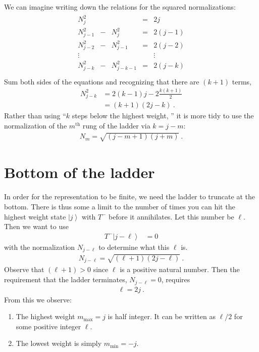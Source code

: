 \documentclass[12pt]{article}
\numberwithin{equation}{section}
\newcommand{\ket}[1]{\left|#1\right\rangle}    %
\begin{document}
We can imagine writing down the relations for the squared normalizations:
\begin{align}
	\begin{array}{ccccc}
	N_j^2 & & &=& 2j \\	
	N_{j-1}^2 & -  & N_j^2 &=& 2(j-1) \\
	N_{j-2}^2 & -  & N_{j-1}^2 &=& 2(j-2) \\
	\vdots & & & & \vdots \\
	N_{j-k}^2 & -  & N_{j-k-1}^2 &=& 2(j-k) \\
	\end{array}
\end{align}
Sum both sides of the equations and recognizing that there are $(k+1)$ terms,
\begin{align}
	N_{j-k}^2 &= 2(k-1)j -  2\frac{k(k+1)}2\\
	& = (k+1)(2j - k) \ .
\end{align}
Rather than using ``$k$ steps below the highest weight, '' it is more tidy to use the normalization of the $m^\text{th}$ rung of the ladder via $k = j-m$:
\begin{align}
	N_m = \sqrt{(j-m+1)(j+m)} \ .
\end{align}

\section{Bottom of the ladder}

In order for the representation to be finite, we need the ladder to truncate at the bottom. There is thus some a limit to the number of times you can hit the highest weight state $\ket{j}$ with $T^-$ before it annihilates. Let this number be $\ell$. Then we want to use
\begin{align}
	T^- \ket{j-\ell} &= 0
\end{align}
with the normalization $N_{j-\ell}$ to determine what this $\ell$ is. 
\begin{align}
	N_{j-\ell} = \sqrt{(\ell+1)(2j - \ell)} \ .
\end{align}
Observe that $(\ell+1) >0$ since $\ell$ is a positive natural number. Then the requirement that the ladder terminates, $N_{j-\ell} = 0$, requires 
\begin{align}
	\ell = 2j \ .
\end{align}
From this we observe:
\begin{enumerate}
	\item The highest weight $m_\text{max} = j$ is half integer. It can be written as $\ell/2$ for some positive integer $\ell$. 
	\item The lowest weight is simply $m_\text{min} = -j$. 
\end{enumerate}






% 
\end{document}
